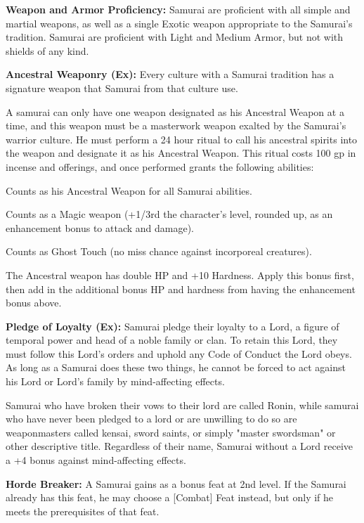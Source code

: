 \classfeatures

\textbf{Weapon and Armor Proficiency:} Samurai are proficient with all simple and martial weapons, as well as a single Exotic weapon appropriate to the Samurai's tradition. Samurai are proficient with Light and Medium Armor, but not with shields of any kind.

\textbf{Ancestral Weaponry (Ex):} Every culture with a Samurai tradition has a signature weapon that Samurai from that culture use.

A samurai can only have one weapon designated as his Ancestral Weapon at a time, and this weapon must be a masterwork weapon exalted by the Samurai's warrior culture. He must perform a 24 hour ritual to call his ancestral spirits into the weapon and designate it as his Ancestral Weapon. This ritual costs 100 gp in incense and offerings, and once performed grants the following abilities:

\begin{itemize*}
\item Counts as his Ancestral Weapon for all Samurai abilities.
\item Counts as a Magic weapon (+1/3rd the character's level, rounded up, as an enhancement bonus to attack and damage).
\item Counts as Ghost Touch (no miss chance against incorporeal creatures).
\item The Ancestral weapon has double HP and +10 Hardness. Apply this bonus first, then add in the additional bonus HP and hardness from having the enhancement bonus above.
\end{itemize*}

\textbf{Pledge of Loyalty (Ex):} Samurai pledge their loyalty to a Lord, a figure of temporal power and head of a noble family or clan. To retain this Lord, they must follow this Lord's orders and uphold any Code of Conduct the Lord obeys. As long as a Samurai does these two things, he cannot be forced to act against his Lord or Lord's family by mind-affecting effects. 

Samurai who have broken their vows to their lord are called Ronin, while samurai who have never been pledged to a lord or are unwilling to do so are weaponmasters called kensai, sword saints, or simply "master swordsman" or other descriptive title. Regardless of their name, Samurai without a Lord receive a +4 bonus against mind-affecting effects.

\textbf{Horde Breaker:} A Samurai gains  as a bonus feat at 2nd level. If the Samurai already has this feat, he may choose a [Combat] Feat instead, but only if he meets the prerequisites of that feat.

